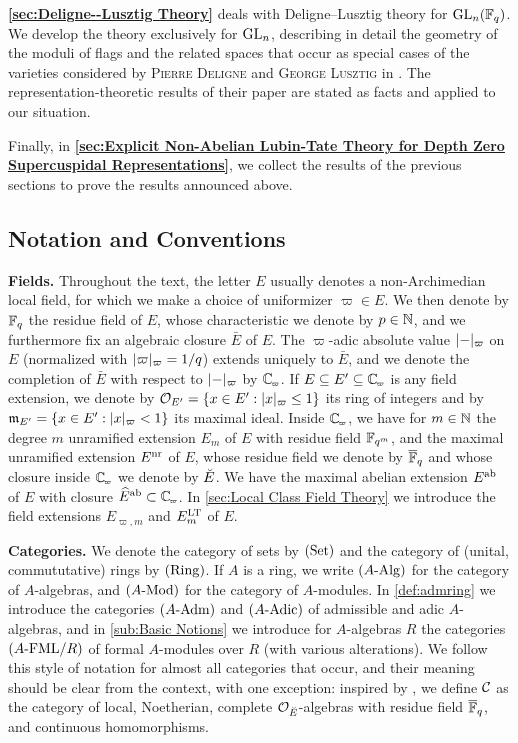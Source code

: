 \documentclass[../main.tex]{subfiles}
\begin{document}
\textbf{\cref{sec:Deligne--Lusztig Theory}} deals with Deligne--Lusztig theory
for $\operatorname{GL}_n(\mathbb{F}_q)$. 
We develop the theory exclusively for $\operatorname{GL}_n$, describing in detail the 
geometry of the moduli of flags and the related spaces that occur as 
special cases of the varieties considered by 
\textsc{Pierre Deligne} and \textsc{George Lusztig} in
\cite{delignelusztig1976}. The representation-theoretic results of their paper
are stated as facts and applied to our situation.

Finally, in \textbf{\cref{sec:Explicit Non-Abelian Lubin-Tate Theory for Depth
Zero Supercuspidal Representations}}, we collect the results of the 
previous sections to prove the results announced above. 

\subsection*{Notation and Conventions} %

\textbf{Fields.} Throughout the text, the letter $E$ usually denotes
a non-Archimedian local field, for which we make a choice of uniformizer
$\varpi \in E$. We then denote by $\mathbb{F}_q$ the residue
field of $E$, whose characteristic we denote by $p \in \mathbb{N}$, and we furthermore fix
an algebraic closure $\bar E$ of $E$. The $\varpi$-adic absolute value $\lvert - \rvert_\varpi$ on $E$ (normalized with $\lvert \varpi \rvert_\varpi = 1/q$) extends uniquely
to $\bar E$, and we denote the completion of $\bar E$ with respect to $\lvert - \rvert_\varpi$ by $\Cp$. If $E \subseteq E' \subseteq \Cp$ is any
field extension, we denote by $\mathcal{O}_{E'} = \{x \in E' : \lvert x \rvert_\varpi \leq 1\}$
its ring of integers and by $\mathfrak{m}_{E'} = \{x \in E' : \lvert x \rvert_{\varpi} < 1\}$ its
maximal ideal. Inside $\Cp$, we have for $m\in \mathbb{N}$ the degree $m$ unramified
extension $E_m$ of $E$ with residue field $\mathbb{F}_{q^m}$, and the maximal unramified extension
$E^{\mathrm{nr}}$ of $E$, whose residue field we denote by ${\overline {\mathbb{F}}_q}$ and whose closure
inside $\Cp$ we denote by ${\breve {E}}$. We have the maximal abelian extension $E^{\mathrm{ab}}$ of 
$E$ with closure $\hat E^\ab \subset \Cp$. In \cref{sec:Local Class Field Theory} we 
introduce the field extensions $E_{\varpi, m}$ and $E^{\mathrm{LT}}_m$ of $E$.

\textbf{Categories.} 
We denote the category of sets by ${(\mathrm{Set})}$ and the category of (unital,
commututative) rings by ${(\mathrm{Ring})}$. If $A$ is a ring, we write ${({A}\textnormal-\allowbreak\mathrm{Alg})}$ for the
category of $A$-algebras, and ${({A}\textnormal-\allowbreak\mathrm{Mod})}$ for the category of $A$-modules.
In \cref{def:admring} we introduce the categories ${({A}\textnormal-\allowbreak\mathrm{Adm})}$ and ${({A}\textnormal-\allowbreak\mathrm{Adic})}$ of 
admissible and adic $A$-algebras, and in \cref{sub:Basic Notions} we introduce 
for $A$-algebras $R$ the categories ${({A}\textnormal-\allowbreak\mathrm{FML}/{R})}$ of formal $A$-modules over $R$
(with various alterations). We follow this style of notation for almost all categories
that occur, and their meaning should be clear from the context, with one exception:
inspired by \cite{drinfel1974elliptic}, we define $\mathcal{C}$ as the category of
local, Noetherian, complete $\mathcal{O}_{\breve {E}}$-algebras with residue field ${\overline {\mathbb{F}}_q}$,
and continuous homomorphisms.
\end{document}
